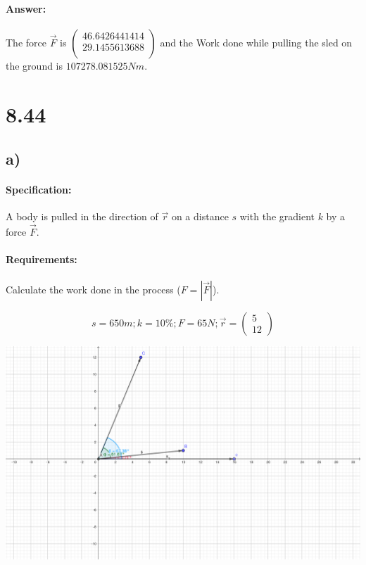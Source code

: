 \documentclass{article}
\begin{document}
\paragraph{Answer:}
The force $\vec{F}$ is $\begin{pmatrix}
        46.6426441414 \\
        29.1455613688 \\ 
    \end{pmatrix}$ and the Work done while pulling the sled on the ground is $107278.081525 Nm$. 

\pagebreak

\section{8.44}
\subsection{a)}

\paragraph{Specification:}
A body is pulled in the direction of $\vec{r}$ on a distance $s$ with the gradient $k$ by a
force $\vec{F}$.

\paragraph{Requirements:}
Calculate the work done in the process ($F = |\vec{F}|$).

\begin{equation}
   s = 650m; k = 10\%; F = 65N; \vec{r} = \begin{pmatrix}
       5 \\ 
       12
   \end{pmatrix} 
\end{equation}

\includegraphics[width=\linewidth]{images/8-44-a.png}
\end{document}
